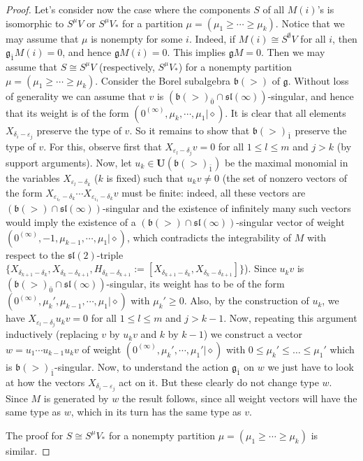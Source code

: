 \documentclass[12pt]{amsart}
\newcommand\g{\mathfrak{g}}
\newcommand\fb{\mathfrak{b}}
\newcommand\fsl{\mathfrak{sl}}
\newcommand\bU{\mathbf{U}}
\theoremstyle{plain}
\theoremstyle{definition}
\numberwithin{equation}{section}
\begin{document}
\begin{proof}
{Let's consider now the case where the components $S$ of all $M(i)$'s is isomorphic to $S^\mu V$ or $S^\mu V_*$ for a partition $\mu = (\mu_1\geq \cdots \geq \mu_k)$. Notice that we may assume that $\mu$ is nonempty for some $i$. Indeed, if $M(i)\cong S^\emptyset V$ for all $i$, then $\g_{\bar 1}M(i)=0$, and hence $\g M(i)=0$.  This implies $\g M=0$. Then we may assume that $S\cong S^\mu V$ (respectively, $S^\mu V_*$) for a nonempty partition $\mu = (\mu_1\geq \cdots \geq \mu_k)$. Consider the Borel subalgebra $\fb(>)$ of $\g$. Without loss of generality we can assume that $v$ is $(\fb(>)_{\bar 0}\cap \fsl(\infty))$-singular, and hence that its weight is of the form $(0^{(\infty)}, \mu_k,\cdots, \mu_1 | \diamond)$. It is clear that all elements $X_{\delta_i-\varepsilon_j}$ preserve the type of $v$. So it remains to show that $\fb(>)_{\bar 1}$ preserve the type of $v$. For this, observe first that $X_{\varepsilon_l-\delta_j}v=0$ for all $1\leq l\leq m$ and $j>k$ (by support arguments). Now, let $u_k\in \bU(\fb(>)_{\bar 1})$ be the maximal monomial in the variables $X_{\varepsilon_l-\delta_k}$ ($k$ is fixed) such that $u_kv\neq 0$ (the set of nonzero vectors of the form $X_{\varepsilon_{i_r}-\delta_k}\cdots X_{\varepsilon_{i_1}-\delta_k}v$ must be finite: indeed, all these vectors are $(\fb(>)\cap\fsl(\infty))$-singular and the existence of infinitely many such vectors would imply the existence of a $(\fb(>)\cap\fsl(\infty))$-singular vector of weight $(0^{(\infty)}, -1,\mu_{k-1},\cdots, \mu_1 | \diamond)$, which contradicts the integrability of $M$ with respect to the $\fsl(2)$-triple $\{X_{\delta_{k+1}-\delta_{k}}, X_{\delta_{k}-\delta_{k+1}}, H_{\delta_{k}-\delta_{k+1}}:=[X_{\delta_{k+1}-\delta_{k}}, X_{\delta_{k}-\delta_{k+1}}]\}$). Since $u_kv$ is $(\fb(>)_{\bar 0}\cap \fsl(\infty))$-singular, its weight has to be of the form $(0^{(\infty)}, \mu_k',\mu_{k-1},\cdots, \mu_1 | \diamond)$ with $\mu_k'\geq 0$. Also, by the construction of $u_k$, we have $X_{\varepsilon_l-\delta_j}u_kv=0$ for all $1\leq l\leq m$ and $j>k-1$. Now, repeating this argument inductively (replacing $v$ by $u_kv$ and $k$ by $k-1$) we construct a vector $w=u_1\cdots u_{k-1}u_kv$ of weight $(0^{(\infty)}, \mu_k',\cdots, \mu_1' | \diamond)$ with $0\leq \mu_k'\leq \ldots \leq \mu_1'$ which is $\fb(>)_{\bar 1}$-singular. Now, to understand the action $\g_{\bar 1}$ on $w$ we just have to look at how the vectors $X_{\delta_i-\varepsilon_j}$ act on it. But these clearly do not change type $w$. Since $M$ is generated by $w$ the result follows, since all weight vectors will have the same type as $w$, which in its turn has the same type as $v$.

The proof for $S\cong S^\mu V_*$ for a nonempty partition $\mu = (\mu_1\geq \cdots \geq \mu_k)$ is similar.
}
\end{proof}
\end{document}

